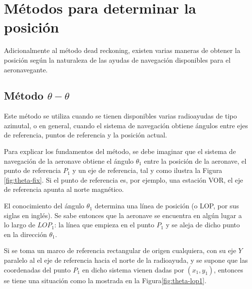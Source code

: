 \section{M\'etodos para determinar la posici\'on \cite{Salazar_nav_aerea}}

Adicionalmente al m\'etodo dead reckoning,  existen varias maneras de obtener la posici\'on seg\'un la naturaleza de las ayudas de navegaci\'on disponibles para el aeronavegante. 


\subsection{M\'etodo $\theta-\theta$}

Este m\'etodo se utiliza cuando se tienen disponibles varias radioayudas de tipo azimutal, o en general, cuando el sistema de navegaci\'on obtiene \'angulos entre ejes de referencia, puntos de referencia y la posici\'on actual.

Para explicar los fundamentos del m\'etodo, se debe imaginar que el sistema de navegaci\'on de la aeronave obtiene el \'angulo $\theta_1$ entre la posici\'on de la aeronave, el punto de referencia $P_1$ y un eje de referencia, tal y como ilustra la Figura \ref{fig:theta-fix}. Si el punto de referencia es, por ejemplo, una estaci\'on VOR, el eje de referencia apunta al norte magn\'etico. 

El conocimiento del \'angulo $\theta_1$ determina una l\'inea de posici\'on (o LOP, por sus siglas en ingl\'es). Se sabe entonces que la aeronave se encuentra en alg\'un lugar a lo largo de $LOP_{1}$: la l\'inea que empieza en el punto $P_1$ y se aleja de dicho punto en la direcci\'on $\theta_1$.

Si se toma un marco de referencia rectangular de origen cualquiera, con su eje $Y$ paralelo al el eje de referencia hacia el norte de la radioayuda, y se supone que las coordenadas del punto $P_1$ en dicho sistema vienen dadas por $(x_1, y_1)$, entonces se tiene una situaci\'on como la mostrada en la Figura\ref{fig:theta-lop1}. 

